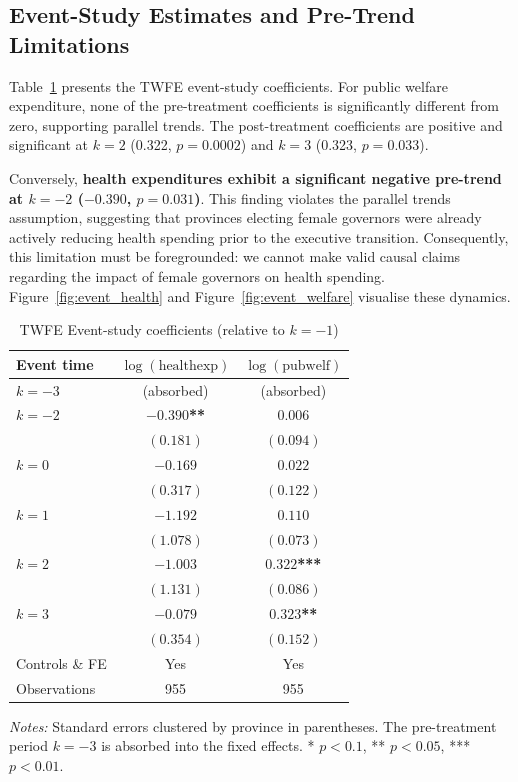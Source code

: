 \documentclass[conference]{IEEEtran}
\begin{document}
\subsection{Event-Study Estimates and Pre-Trend Limitations}
Table~\ref{tab:event} presents the TWFE event-study coefficients. For public welfare expenditure, none of the pre-treatment coefficients is significantly different from zero, supporting parallel trends. The post-treatment coefficients are positive and significant at $k=2$ (0.322, $p=0.0002$) and $k=3$ (0.323, $p=0.033$).

Conversely, \textbf{health expenditures exhibit a significant negative pre-trend at $k=-2$ ($-0.390$, $p=0.031$)}. This finding violates the parallel trends assumption, suggesting that provinces electing female governors were already actively reducing health spending prior to the executive transition. Consequently, this limitation must be foregrounded: we cannot make valid causal claims regarding the impact of female governors on health spending. Figure~\ref{fig:event_health} and Figure~\ref{fig:event_welfare} visualise these dynamics.

\begin{table}[htbp]
\centering
\caption{TWFE Event-study coefficients (relative to $k=-1$)}\label{tab:event}
\begin{tabular}{lcc}
\toprule
Event time & $\log(\text{healthexp})$ & $\log(\text{pubwelf})$ \\
\midrule
$k=-3$ & (absorbed) & (absorbed) \\
$k=-2$ & \textbf{$-0.390$**} & $0.006$ \\
 & $(0.181)$ & $(0.094)$ \\
$k=0$ & $-0.169$ & $0.022$ \\
 & $(0.317)$ & $(0.122)$ \\
$k=1$ & $-1.192$ & $0.110$ \\
 & $(1.078)$ & $(0.073)$ \\
$k=2$ & $-1.003$ & \textbf{$0.322$***} \\
 & $(1.131)$ & $(0.086)$ \\
$k=3$ & $-0.079$ & \textbf{$0.323$**} \\
 & $(0.354)$ & $(0.152)$ \\
\addlinespace
Controls \& FE & Yes & Yes \\
Observations & 955 & 955 \\
\bottomrule
\end{tabular}

\vspace{0.5em}
\parbox{0.95\columnwidth}{\footnotesize \textit{Notes:} Standard errors clustered by province in parentheses. The pre-treatment period $k=-3$ is absorbed into the fixed effects. * $p<0.1$, ** $p<0.05$, *** $p<0.01$.}
\end{table}
\end{document}
